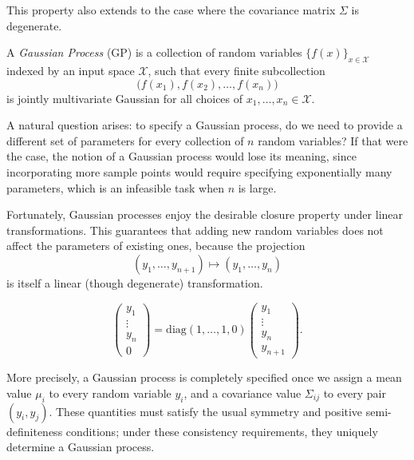\documentclass[../main]{subfiles}
\begin{document}
    \begin{note}
        This property also extends to the case where the covariance matrix
        $\Sigma$ is degenerate.
    \end{note}
    \begin{definition}
        A \emph{Gaussian Process} (GP) is a collection of random variables
        $\{f(x)\}_{x\in\mathcal X}$ indexed by an input space $\mathcal X$,
        such that every finite subcollection
        \begin{equation}
            \bigl(f(x_1), f(x_2), \dots, f(x_n)\bigr)
        \end{equation}
        is jointly multivariate Gaussian for all choices of $x_1,\dots,x_n\in\mathcal X$.
        \end{definition}
    A natural question arises:  
    to specify a Gaussian process, do we need to provide a different set
    of parameters for every collection of $n$ random variables?
    If that were the case, the notion of a Gaussian process would lose
    its meaning, since incorporating more sample points would require
    specifying exponentially many parameters, which is an infeasible task when $n$ is large.
    
    Fortunately, Gaussian processes enjoy the desirable closure property
    under linear transformations.  
    This guarantees that adding new random variables does not affect the
    parameters of existing ones, because the projection
    \[
        (y_1,\dots,y_{n+1}) \mapsto (y_1,\dots,y_n)
    \]
    is itself a linear (though degenerate) transformation.
    
    \begin{note}
    \begin{equation}
        \begin{pmatrix}
            y_1\\[2pt]
            \vdots\\[2pt]
            y_n\\[2pt]
            0
        \end{pmatrix}
        =
        \mathrm{diag}(1,\dots,1,0)
        \begin{pmatrix}
            y_1\\[2pt]
            \vdots\\[2pt]
            y_n\\[2pt]
            y_{n+1}
        \end{pmatrix}.
    \end{equation}
    \end{note}
More precisely, a Gaussian process is completely specified once we assign
a mean value $\mu_i$ to every random variable $y_i$, and a covariance value
$\Sigma_{ij}$ to every pair $(y_i, y_j)$.  
These quantities must satisfy the usual symmetry and positive
semi-definiteness conditions; under these consistency requirements,
they uniquely determine a Gaussian process.
\end{document}
